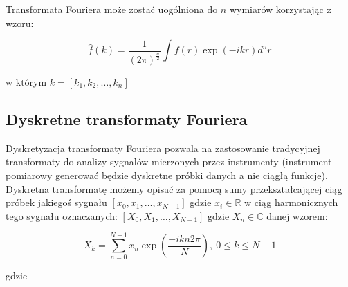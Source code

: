 \documentclass{artikel3}
\begin{document}
Transformata Fouriera może zostać uogólniona do $n$ wymiarów korzystając z wzoru:

\begin{equation}
    \hat{f}(k) = \frac{1}{{(2\pi)}^\frac{n}{2}} \int f(r) \exp{(-ikr)} d^n r
\end{equation}

w którym $k=[k_1,k_2,\ldots, k_n]$

\subsection*{Dyskretne transformaty Fouriera}
Dyskretyzacja transformaty Fouriera pozwala na zastosowanie tradycyjnej transformaty do analizy sygnalów mierzonych przez instrumenty (instrument pomiarowy generować będzie dyskretne próbki danych a nie ciągłą funkcje).
Dyskretna transformatę możemy opisać za pomocą sumy przekształcającej ciąg próbek jakiegoś sygnału $[x_0, x_1, \ldots, x_{N-1}]$ gdzie $x_i \in \mathbb{R}$ w ciąg harmonicznych tego sygnału oznaczanych: $[X_0, X_1, \ldots, X_{N-1}]$ gdzie $X_n \in \mathbb{C}$ danej wzorem:

\begin{equation}
    X_k = \sum_{n=0}^{N-1} x_n \exp{\left(\frac{-i k n 2\pi}{N}\right)} , \ 0 \le k \le N - 1
\end{equation}

gdzie 
\end{document}
